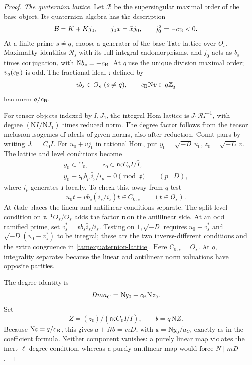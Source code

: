 \begin{proof}
\emph{The quaternion lattice.}
Let \(\mathcal R\) be the supersingular maximal order of the
base object. Its quaternion algebra has the description
\[
 \mathcal B=K+Kj_0,\qquad j_0x=\bar xj_0,\qquad
 j_0^2=-c_{\rm B}<0.
\]
At a finite prime \(s\ne q\), choose a generator of the base
Tate lattice over \(O_s\). Maximality identifies \(\mathcal R_s\)
with its full integral endomorphisms, and \(j_0\) acts as
\(b_s\) times conjugation, with \(\mathrm Nb_s=-c_{\rm B}\).
At \(q\) use the unique division maximal order; \(v_q(c_{\rm B})\)
is odd. The fractional ideal \(\mathfrak c\) defined by
\[
 vb_s\in O_s\ (s\ne q),\qquad
 c_{\rm B}\mathrm Nv\in q\mathbb Z_q
\]
has norm \(q/c_{\rm B}\).

For tensor objects indexed by \(I,J_1\), the integral Hom
lattice is \(J_1\mathcal RI^{-1}\), with degree
\((\mathrm NI/\mathrm NJ_1)\) times reduced norm. The degree
factor follows from the tensor inclusion isogenies of ideals
of given norms, also after reduction. Count pairs by writing
\(J_1=C_0I\). For \(u_0+vj_0\) in rational Hom, put
\(y_0=\sqrt{-D}\,u_0\), \(z_0=\sqrt{-D}\,v\).
The lattice and level conditions become
\begin{equation}\label{tame:quaternion-lattice}
 \begin{gathered}
 y_0\in C_0,\qquad
 z_0\in\bar{\mathfrak n}\mathfrak cC_0I/\bar I,\\
 y_0+z_0b_p\,\bar i_p/i_p\equiv0\pmod{\mathfrak p}
                    \qquad(p\mid D),
 \end{gathered}
\end{equation}
where \(i_p\) generates \(I\) locally.
To check this, away from \(q\) test
\[
 u_0t+vb_s(\bar i_s/i_s)\bar t\in C_{0,s}
                    \qquad(t\in O_s).
\]
At étale places the linear and antilinear conditions separate.
The split level condition on \(\mathfrak n^{-1}O_s/O_s\)
adds the factor \(\bar{\mathfrak n}\) on the antilinear side.
At an odd ramified prime, set \(v_s^*=vb_s\bar i_s/i_s\).
Testing on \(1,\sqrt{-D}\) requires \(u_0+v_s^*\) and
\(\sqrt{-D}(u_0-v_s^*)\) to be integral; these are the two
inverse-different conditions and the extra congruence in
\eqref{tame:quaternion-lattice}. Here \(C_{0,s}=O_s\).
At \(q\), integrality separates because the linear and
antilinear norm valuations have opposite parities.

The degree identity is
\[
 Dma_C=\mathrm Ny_0+c_{\rm B}\mathrm Nz_0.
\]
Set
\[
 Z=(z_0)/(\bar{\mathfrak n}\mathfrak cC_0I/\bar I),
 \qquad b=q\,\mathrm NZ.
\]
Because \(\mathrm N\mathfrak c=q/c_{\rm B}\), this gives
\(a+Nb=mD\), with \(a=\mathrm Ny_0/a_C\), exactly as in the
coefficient formula. Neither component vanishes: a purely
linear map violates the inert-\(\ell\) degree condition,
whereas a purely antilinear map would force \(N\mid mD\).


\end{proof}
